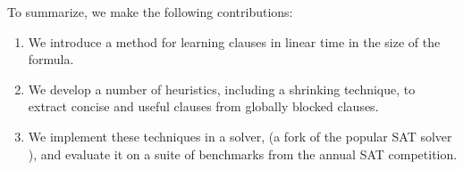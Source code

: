 
To summarize, we make the following contributions: 

\begin{enumerate} 
    \item We introduce a method for learning \pr clauses in linear time in the size of the formula. 
    \item We develop a number of heuristics, including a shrinking technique, to extract concise and useful \pr clauses from globally blocked clauses. 
    \item We implement these techniques in a solver, \tool (a fork of the popular SAT solver \cadical), and evaluate it on a suite of benchmarks from the annual SAT competition.
\end{enumerate}